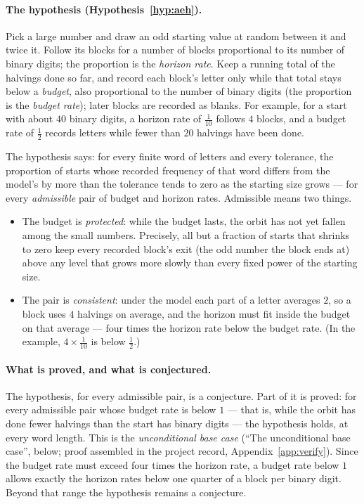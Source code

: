 \documentclass[11pt]{article}
\theoremstyle{remark}
\begin{document}
\paragraph{The hypothesis (Hypothesis~\ref{hyp:aeh}).} Pick a large number and draw an odd starting value at random between it and twice it. Follow its blocks for a number of blocks proportional to its number of binary digits; the proportion is the \emph{horizon rate}. Keep a running total of the halvings done so far, and record each block's letter only while that total stays below a \emph{budget}, also proportional to the number of binary digits (the proportion is the \emph{budget rate}); later blocks are recorded as blanks. For example, for a start with about $40$ binary digits, a horizon rate of $\tfrac1{10}$ follows $4$ blocks, and a budget rate of $\tfrac12$ records letters while fewer than $20$ halvings have been done.

The hypothesis says: for every finite word of letters and every tolerance, the proportion of starts whose recorded frequency of that word differs from the model's by more than the tolerance tends to zero as the starting size grows --- for every \emph{admissible} pair of budget and horizon rates. Admissible means two things.
\begin{itemize}
\item The budget is \emph{protected}: while the budget lasts, the orbit has not yet fallen among the small numbers. Precisely, all but a fraction of starts that shrinks to zero keep every recorded block's exit (the odd number the block ends at) above any level that grows more slowly than every fixed power of the starting size.
\item The pair is \emph{consistent}: under the model each part of a letter averages $2$, so a block uses $4$ halvings on average, and the horizon must fit inside the budget on that average --- four times the horizon rate below the budget rate. (In the example, $4 \times \tfrac1{10}$ is below $\tfrac12$.)
\end{itemize}

\paragraph{What is proved, and what is conjectured.} The hypothesis, for every admissible pair, is a conjecture. Part of it is proved: for every admissible pair whose budget rate is below $1$ --- that is, while the orbit has done fewer halvings than the start has binary digits --- the hypothesis holds, at every word length. This is the \emph{unconditional base case} (``The unconditional base case'', below; proof assembled in the project record, Appendix~\ref{app:verify}). Since the budget rate must exceed four times the horizon rate, a budget rate below $1$ allows exactly the horizon rates below one quarter of a block per binary digit. Beyond that range the hypothesis remains a conjecture.
\end{document}
